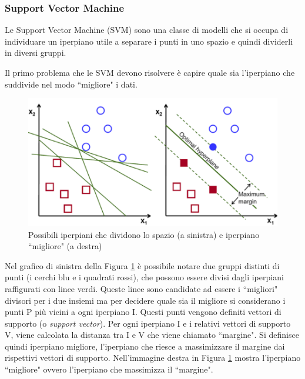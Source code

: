 \documentclass[12pt,italian]{report}
\begin{document}
\subsubsection{Support Vector Machine}
Le Support Vector Machine (SVM) sono una classe di modelli che si occupa di individuare un iperpiano utile a separare i punti in uno spazio e quindi dividerli in diversi gruppi. 

Il primo problema che le SVM devono risolvere è capire quale sia l'iperpiano che suddivide nel modo ``migliore" i dati. 

\begin{figure}[h!]
	\center
	\includegraphics[scale=0.4]{../img/svc} %
	\caption{Possibili iperpiani che dividono lo spazio (a sinistra) e iperpiano ``migliore" (a destra)}
	\label{fig:svc}
\end{figure}

Nel grafico di sinistra della Figura \ref{fig:svc} è possibile notare due gruppi distinti di punti (i cerchi blu e i quadrati rossi), che possono essere divisi dagli iperpiani raffigurati con linee verdi. Queste linee sono candidate ad essere i ``migliori" divisori per i due insiemi ma per decidere quale sia il migliore si considerano i punti P più vicini a ogni iperpiano I. Questi punti vengono definiti vettori di supporto (o \emph{support vector}). Per ogni iperpiano I e i relativi vettori di supporto V, viene calcolata la distanza tra I e V che viene chiamato ``margine". Si definisce quindi iperpiano migliore, l'iperpiano che riesce a massimizzare il margine dai rispettivi vettori di supporto. Nell'immagine destra in Figura \ref{fig:svc} mostra l'iperpiano ``migliore" ovvero l'iperpiano che massimizza il ``margine".
\end{document}
